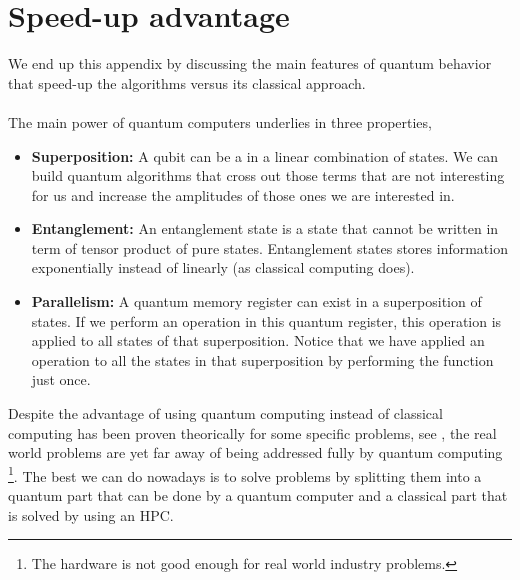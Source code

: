 \section{Speed-up advantage}
We end up this appendix by discussing the main features of quantum behavior that speed-up the algorithms versus its classical approach.\\\\
The main power of quantum computers underlies in three properties,
\begin{itemize}
    \item \textbf{Superposition:} A qubit can be a in a linear combination of states. We can build quantum algorithms that cross out those terms that are not interesting for us and increase the amplitudes of those ones we are interested in.
    \item \textbf{Entanglement:} An entanglement state is a state that cannot be written in term of tensor product of pure states. Entanglement states stores information exponentially instead of linearly (as classical computing does). 
    \item \textbf{Parallelism:} A quantum memory register can exist in a superposition of states. If we perform an operation in this quantum register, this operation is applied to all states of that superposition. Notice that we have applied an operation to all the states in that superposition by performing the function just once.
\end{itemize}
Despite the advantage of using quantum computing instead of classical computing has been proven theorically for some specific problems, see \cite{Grover1996Search}, the real world problems are yet far away of being addressed fully by quantum computing \footnote{The hardware is not good enough for real world industry problems.}. The best we can do nowadays is to solve problems by splitting them into a quantum part that can be done by a quantum computer and a classical part that is solved by using an HPC.
